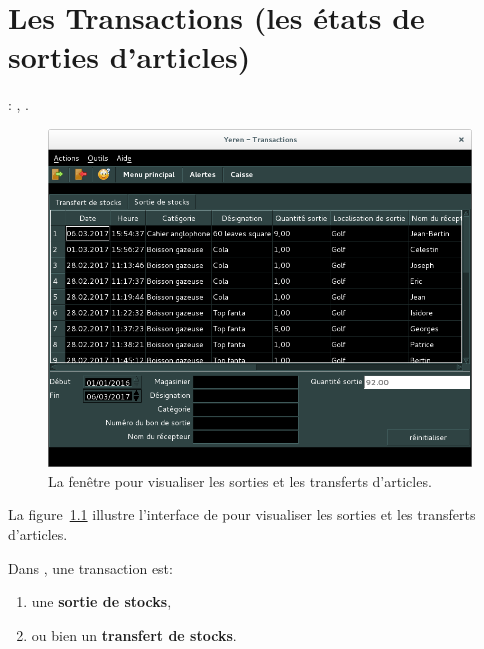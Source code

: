 \chapter{Les Transactions (les \'etats de sorties
	d'articles)}\label{chap:etats-des-sorties}

\utilisateurs: \lienmagasinier, \lienmanager.\\



\begin{figure}[!htbp]
	\centering
	\includegraphics[scale=0.45]{images/yeren-transactions.png}
	\caption{La fen\^etre pour visualiser les sorties et les
		transferts d'articles.}
	\label{fig:yeren-transactions}
\end{figure}

La figure~\ref{fig:yeren-transactions} illustre
l'interface de \yeren pour visualiser les sorties et les
transferts d'articles.

Dans \yeren, une transaction est:
\begin{enumerate}[1)]
	\item une \textbf{sortie de stocks},
	\item ou bien un \textbf{transfert de stocks}.\\
\end{enumerate}

